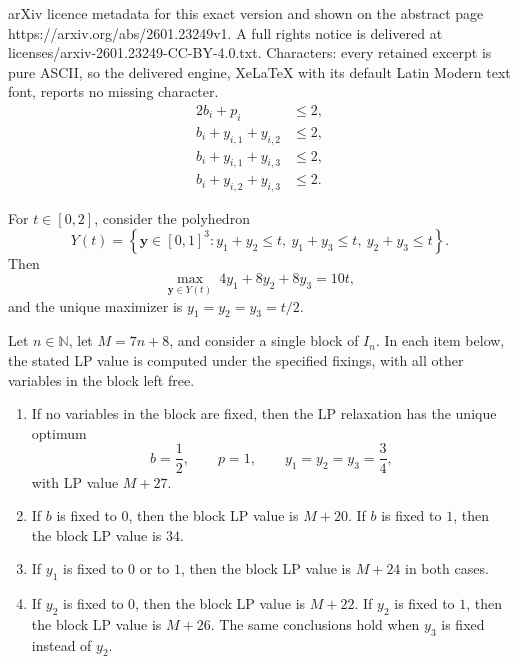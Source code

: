 \documentclass[10pt,a4paper]{amsart}
\newcommand{\N}{\mathbb{N}}
\newcommand{\set}[1]{\left\{#1\right\}}
\newcommand{\y}{\mathbf{y}}
\begin{document}
arXiv licence metadata for this exact version and shown on the abstract page https://arxiv.org/abs/2601.23249v1. A full rights notice is delivered at licenses/arxiv-2601.23249-CC-BY-4.0.txt. Characters: every retained excerpt is pure ASCII, so the delivered engine, XeLaTeX with its default Latin Modern text font, reports no missing character.
	\begin{align}
		2b_i+p_i            & \le 2,\label{eq:block_C1}  \\
		b_i+y_{i,1}+y_{i,2} & \le 2,\label{eq:block_C2a} \\
		b_i+y_{i,1}+y_{i,3} & \le 2,\label{eq:block_C2b} \\
		b_i+y_{i,2}+y_{i,3} & \le 2.\label{eq:block_C2c}
	\end{align}

\begin{lemma}\label{lem:triangle_pack}
	For $t\in[0,2]$, consider the polyhedron
	\[
		Y(t)=\set{\y\in[0,1]^3 : y_1+y_2\le t,\ y_1+y_3\le t,\ y_2+y_3\le t}.
	\]
	Then
	\[
		\max_{\y\in Y(t)}\ 4y_1+8y_2+8y_3=10t,
	\]
	and the unique maximizer is $y_1=y_2=y_3=t/2$.
\end{lemma}

\begin{lemma}\label{lem:block_values}
	Let $n\in\N$, let $M=7n+8$, and consider a single block of $I_n$.
	In each item below, the stated LP value is computed under the specified fixings, with all other variables in the block left free.
	\begin{enumerate}
		\item If no variables in the block are fixed, then the LP relaxation has the unique optimum
		      \[
			      b=\frac12,\qquad p=1,\qquad y_1=y_2=y_3=\frac34,
		      \]
		      with LP value $M+27$.
		\item If $b$ is fixed to $0$, then the block LP value is $M+20$.
		      If $b$ is fixed to $1$, then the block LP value is $34$.
		\item If $y_1$ is fixed to $0$ or to $1$, then the block LP value is $M+24$ in both cases.
		\item If $y_2$ is fixed to $0$, then the block LP value is $M+22$.
		      If $y_2$ is fixed to $1$, then the block LP value is $M+26$.
		      The same conclusions hold when $y_3$ is fixed instead of $y_2$.
	\end{enumerate}
\end{lemma}
\end{document}
